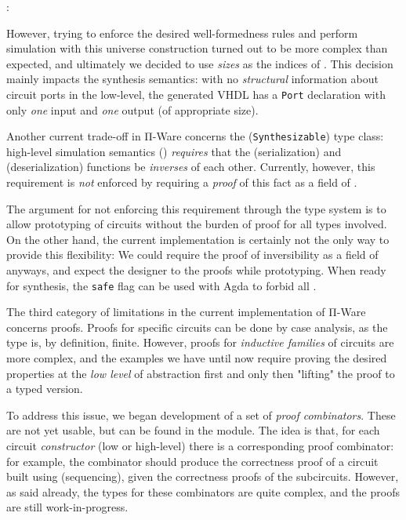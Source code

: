            \begin{center}
                 :  \AY{(}  \AY{)} 
            \end{center}

            However, trying to enforce the desired well-formedness rules and perform simulation
            with this universe construction turned out to be more complex than expected,
            and ultimately we decided to use \emph{sizes} as the indices of .
            This decision mainly impacts the synthesis semantics:
            with no \emph{structural} information about circuit ports in the low-level,
            the generated \ac{VHDL} has a \texttt{Port} declaration with only
            \emph{one} input and \emph{one} output (of appropriate size).

            Another current trade-off in Π-Ware concerns the  (\texttt{Synthesizable})
            type class: high-level simulation semantics () \emph{requires} that the
             (serialization) and  (deserialization) functions be \emph{inverses} of each other.
            Currently, however, this requirement is \emph{not} enforced by requiring a \emph{proof} of
            this fact as a field of .

            The argument for not enforcing this requirement through the type system is to allow
            prototyping of circuits without the burden of proof for all types involved.
            On the other hand, the current implementation is certainly not the only way to provide this flexibility:
            We could require the proof of inversibility as a field of  anyways,
            and expect the designer to  the proofs while prototyping.
            When ready for synthesis, the \texttt{safe} flag can be used with Agda to forbid all .

            The third category of limitations in the current implementation of Π-Ware concerns proofs.
            Proofs for specific circuits can be done by case analysis, as the  type is,
            by definition, finite.
            However, proofs for \emph{inductive families} of circuits are more complex, and
            the examples we have until now require proving the desired properties at the
            \emph{low level} of abstraction first and only then "lifting" the proof to a
            typed version.

            To address this issue, we began development of a set of \emph{proof combinators}.
            These are not yet usable, but can be found in the  module.
            The idea is that, for each circuit \emph{constructor} (low or high-level) there is
            a corresponding proof combinator: for example, the  combinator should produce the
            correctness proof of a circuit built using  (sequencing), given the correctness
            proofs of the subcircuits.
            However, as said already, the types for these combinators are quite complex,
            and the proofs are still work-in-progress.

